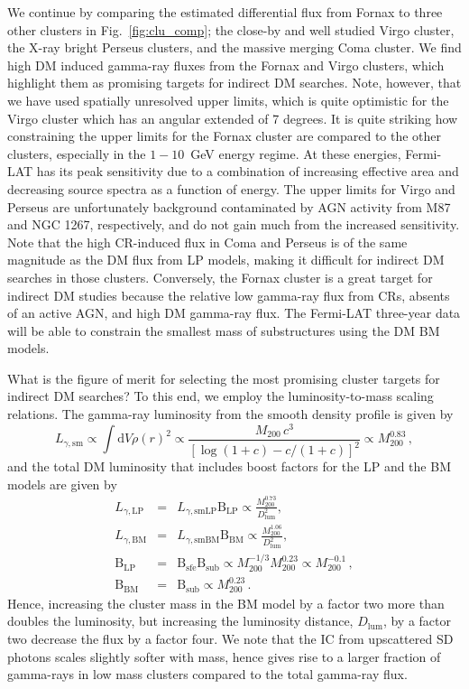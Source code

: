 \documentclass[10pt,aps,pra,reprint,amsmath,amsfonts,amssymb,showpacs,nofootinbib,floatfix]{revtex4-1}
\newcommand{\rmn}{\mathrm}
\newcommand{\sfe}{\rmn{sfe}}
\newcommand{\sub}{\rmn{sub}}
\newcommand{\B}{\rmn{B}}
\newcommand{\sm}{\rmn{sm}}
\newcommand{\dd}{\rmn{d}}
\newcommand{\mvir}{M_{200}}
\begin{document}
We continue by comparing the estimated differential flux from Fornax
to three other clusters in Fig.~\ref{fig:clu_comp}; the close-by and
well studied Virgo cluster, the X-ray bright Perseus clusters, and the
massive merging Coma cluster. We find high DM induced gamma-ray fluxes
from the Fornax and Virgo clusters, which highlight them as
promising targets for indirect DM searches. Note, however, that we
have used spatially unresolved upper limits, which is quite optimistic
for the Virgo cluster which has an angular extended of 7 degrees. It
is quite striking how constraining the upper limits for the Fornax
cluster are compared to the other clusters, especially in the
$1-10$~GeV energy regime. At these energies, Fermi-LAT has its peak
sensitivity due to a combination of increasing effective area and
decreasing source spectra as a function of energy. The upper limits
for Virgo and Perseus are unfortunately background contaminated by AGN
activity from M87 and NGC 1267, respectively, and do not gain much
from the increased sensitivity. Note that the high CR-induced flux in
Coma and Perseus is of the same magnitude as the DM flux from LP
models, making it difficult for indirect DM searches in those
clusters. Conversely, the Fornax cluster is a great target for indirect
DM studies because the relative low gamma-ray flux from CRs, absents
of an active AGN, and high DM gamma-ray flux. The Fermi-LAT three-year
data will be able to constrain the smallest mass of substructures
using the DM BM models. 

What is the figure of merit for selecting the most promising cluster
targets for indirect DM searches? To this end, we employ the
luminosity-to-mass scaling relations. The gamma-ray luminosity from
the smooth density profile is given by \cite{2009PhRvL.103r1302P}
\begin{equation}
L_{\gamma,\sm} \propto \int \dd V \rho(r)^2 \propto \frac{M_{200}\,c^3}
{\left[\log\left(1+c\right)-c/(1+c)\right]^2} \propto \mvir^{0.83}\,,
\end{equation}
and the total DM luminosity that includes boost factors for the LP and
the BM models are given by
\begin{eqnarray}
\label{eq:LP_scaling}
L_{\gamma,\rmn{LP}} &=& L_{\gamma,\rmn{smLP}} \B_\rmn{LP} \propto \frac{\mvir^{0.73}}{D_\rmn{lum}^2},\\
\label{eq:BM_scaling}
L_{\gamma,\rmn{BM}} &=& L_{\gamma,\rmn{smBM}} \B_\rmn{BM} \propto  \frac{\mvir^{1.06}}{D_\rmn{lum}^2},\\
\B_\rmn{LP}&=&\B_\sfe \B_\sub \propto \mvir^{-1/3}\mvir^{0.23} \propto
 \mvir^{-0.1}\,,\\
\B_\rmn{BM}&=&\B_\sub \propto \mvir^{0.23}\,.
\end{eqnarray}
Hence, increasing the cluster mass in the BM model by a factor two
more than doubles the luminosity, but increasing the luminosity
distance, $D_\rmn{lum}$, by a factor two decrease the flux by a factor
four. We note that the IC from upscattered SD photons scales slightly
softer with mass, hence gives rise to a larger fraction of gamma-rays
in low mass clusters compared to the total gamma-ray flux.
\end{document}
